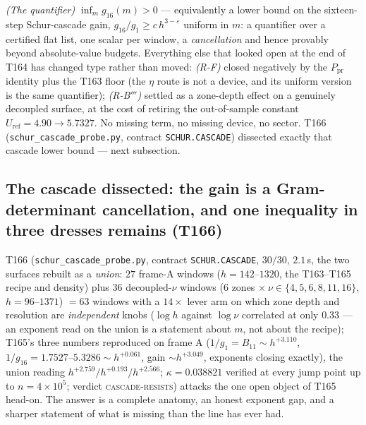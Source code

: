 \documentclass[11pt,a4paper]{article}
\begin{document}
\begin{keybox}
\emph{(The quantifier)} $\inf_m g_{16}(m)>0$ --- equivalently a lower bound
on the sixteen-step Schur-cascade gain, $g_{16}/g_1\ge c\,h^{3-\varepsilon}$
uniform in $m$: a quantifier over a certified flat list, one scalar per
window, a \emph{cancellation} and hence provably beyond absolute-value
budgets. Everything else that looked open at the end of T164 has changed type
rather than moved: \emph{(R-F)} closed negatively by the $P_{\mathrm{pr}}$
identity plus the T163 floor (the $\eta$ route is not a device, and its
uniform version is the same quantifier); \emph{(R-B$'''$)} settled as a
zone-depth effect on a genuinely decoupled surface, at the cost of retiring
the out-of-sample constant $U_{\mathrm{ref}}=4.90\to5.7327$. No missing term,
no missing device, no sector. T166 (\texttt{schur\_cascade\_probe.py},
contract \texttt{SCHUR.CASCADE}) dissected exactly that cascade lower bound
--- next subsection.
\end{keybox}

\subsection{The cascade dissected: the gain is a Gram-determinant
cancellation, and one inequality in three dresses remains (T166)}
T166 (\texttt{schur\_cascade\_probe.py}, contract \texttt{SCHUR.CASCADE},
$30/30$, $2.1$\,s, the two surfaces rebuilt as a \emph{union}: $27$ frame-A
windows ($h=142$--$1320$, the T163--T165 recipe and density) plus $36$
decoupled-$\nu$ windows ($6$ zones $\times\ \nu\in\{4,5,6,8,11,16\}$,
$h=96$--$1371$) $=63$ windows with a $14\times$ lever arm on which zone depth
and resolution are \emph{independent} knobs ($\log h$ against $\log\nu$
correlated at only $0.33$ --- an exponent read on the union is a statement
about $m$, not about the recipe); T165's three numbers reproduced on frame A
($1/g_1=B_{11}\sim h^{+3.110}$, $1/g_{16}=1.7527$--$5.3286\sim h^{+0.061}$,
gain $\sim h^{+3.049}$, exponents closing exactly), the union reading
$h^{+2.759}/h^{+0.193}/h^{+2.566}$; $\kappa=0.038821$ verified at every jump
point up to $n=4\times10^{5}$; verdict \textsc{cascade-resists}) attacks the
one open object of T165 head-on. The answer is a complete anatomy, an honest
exponent gap, and a sharper statement of what is missing than the line has
ever had.
\end{document}
